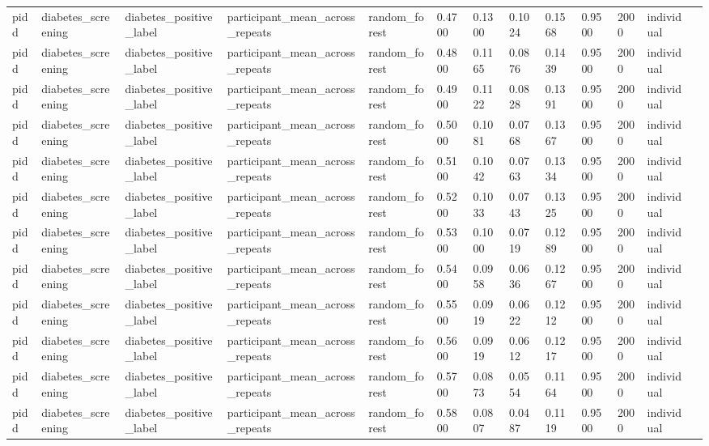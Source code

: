\begin{tabular}{lllllllllllll}
pidd & diabetes\_screening & diabetes\_positive\_label & participant\_mean\_across\_repeats & random\_forest & 0.4700 & 0.1300 & 0.1024 & 0.1568 & 0.9500 & 2000 & individual &  \\
pidd & diabetes\_screening & diabetes\_positive\_label & participant\_mean\_across\_repeats & random\_forest & 0.4800 & 0.1165 & 0.0876 & 0.1439 & 0.9500 & 2000 & individual &  \\
pidd & diabetes\_screening & diabetes\_positive\_label & participant\_mean\_across\_repeats & random\_forest & 0.4900 & 0.1122 & 0.0828 & 0.1391 & 0.9500 & 2000 & individual &  \\
pidd & diabetes\_screening & diabetes\_positive\_label & participant\_mean\_across\_repeats & random\_forest & 0.5000 & 0.1081 & 0.0768 & 0.1367 & 0.9500 & 2000 & individual &  \\
pidd & diabetes\_screening & diabetes\_positive\_label & participant\_mean\_across\_repeats & random\_forest & 0.5100 & 0.1042 & 0.0763 & 0.1334 & 0.9500 & 2000 & individual &  \\
pidd & diabetes\_screening & diabetes\_positive\_label & participant\_mean\_across\_repeats & random\_forest & 0.5200 & 0.1033 & 0.0743 & 0.1325 & 0.9500 & 2000 & individual &  \\
pidd & diabetes\_screening & diabetes\_positive\_label & participant\_mean\_across\_repeats & random\_forest & 0.5300 & 0.1000 & 0.0719 & 0.1289 & 0.9500 & 2000 & individual &  \\
pidd & diabetes\_screening & diabetes\_positive\_label & participant\_mean\_across\_repeats & random\_forest & 0.5400 & 0.0958 & 0.0636 & 0.1267 & 0.9500 & 2000 & individual &  \\
pidd & diabetes\_screening & diabetes\_positive\_label & participant\_mean\_across\_repeats & random\_forest & 0.5500 & 0.0919 & 0.0622 & 0.1212 & 0.9500 & 2000 & individual &  \\
pidd & diabetes\_screening & diabetes\_positive\_label & participant\_mean\_across\_repeats & random\_forest & 0.5600 & 0.0919 & 0.0612 & 0.1217 & 0.9500 & 2000 & individual &  \\
pidd & diabetes\_screening & diabetes\_positive\_label & participant\_mean\_across\_repeats & random\_forest & 0.5700 & 0.0873 & 0.0554 & 0.1164 & 0.9500 & 2000 & individual &  \\
pidd & diabetes\_screening & diabetes\_positive\_label & participant\_mean\_across\_repeats & random\_forest & 0.5800 & 0.0807 & 0.0487 & 0.1119 & 0.9500 & 2000 & individual &  \\

\end{tabular}
